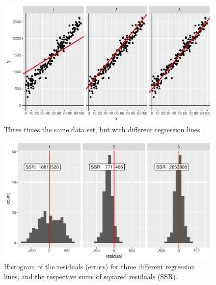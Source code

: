 \documentclass[]{report}\usepackage[]{graphicx}\usepackage[]{color}
\makeatletter
\def\maxwidth{ %
  \ifdim\Gin@nat@width>\linewidth
    \linewidth
  \else
    \Gin@nat@width
  \fi
}
\newenvironment{knitrout}{}{} %
\makeatother
\begin{document}
\begin{knitrout}
\color{fgcolor}\begin{figure}

{\centering \includegraphics[width=\maxwidth]{figure/lm_13-1} 

}

\caption[Three times the same data set, but with different regression lines]{Three times the same data set, but with different regression lines.}\label{fig:lm_13}
\end{figure}


\end{knitrout}

\begin{knitrout}
\color{fgcolor}\begin{figure}

{\centering \includegraphics[width=\maxwidth]{figure/lm_14-1} 

}

\caption[Histogram of the residuals (errors) for three different regression lines, and the respective sums of squared residuals (SSR)]{Histogram of the residuals (errors) for three different regression lines, and the respective sums of squared residuals (SSR).}\label{fig:lm_14}
\end{figure}


\end{knitrout}
\end{document}
